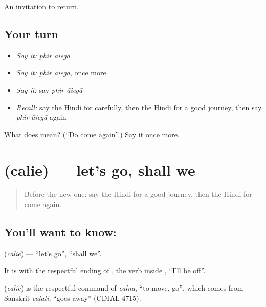 \begin{grammarlens}[title={What you've built}]
An invitation to return.
\end{grammarlens}

\subsection*{Your turn}
\begin{itemize}
\raggedright
  \item \emph{Say it:} \emph{phir āiegā}
  \item \emph{Say it:} \emph{phir āiegā}, once more
  \item \emph{Say it:} say \emph{phir āiegā}
  \item \emph{Recall:} say the Hindi for carefully, then the Hindi for a good journey, then say \emph{phir āiegā} again
\end{itemize}

\begin{tcolorbox}[breakable,colback=teal!4,colframe=teal!35!black,title={Before you move on}]
What does   mean? (\textquotedblleft{}Do come again\textquotedblright{}.) Say it once more.
\end{tcolorbox}
\section[\texorpdfstring{\hi{चलिए} (calie)}{चलिए (calie)}]{ (calie) — let's go, shall we}

\label{lesson:HI-C121-chalie}



\begin{quote}
Before the new one: say the Hindi for a good journey, then the Hindi for come again.
\end{quote}

\subsection*{You'll want to know: }
\textbf{} (\emph{calie}) — \textquotedblleft{}let's go\textquotedblright{}, \textquotedblleft{}shall we\textquotedblright{}.

It is \textbf{} with the respectful ending of \textbf{}, the verb inside \textbf{ }, \textquotedblleft{}I'll be off\textquotedblright{}.

\begin{cousinweb}
\textbf{} (\emph{calie}) is the respectful command of \emph{calnā}, \textquotedblleft{}to move, go\textquotedblright{}, which comes from Sanskrit \emph{calati}, \textquotedblleft{}goes away\textquotedblright{} (CDIAL 4715).
\end{cousinweb}

